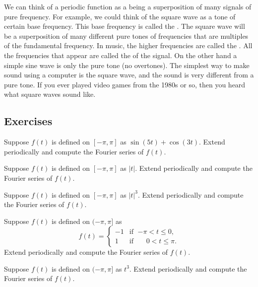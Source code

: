 We can think of a periodic function as a  being a superposition of
many signals of pure frequency.  For example, we could think of the square
wave as a tone of certain base frequency.
This base frequency is called the
\emph{}.
The square wave
will be
a superposition of
many different pure tones of frequencies that are multiples of the
fundamental frequency.
In music,
the higher frequencies are called the \emph{}.
All the frequencies that appear are called the
\emph{} of the signal.
On the other hand a simple sine wave is only the pure tone (no overtones).  The
simplest way to make sound using a computer is the square wave, and the sound
is very different from a pure tone.  If you ever played video games
from the 1980s or so, then you heard what square waves sound like.

\subsection{Exercises}

\begin{exercise}
Suppose $f(t)$ is defined on $[-\pi,\pi]$ as $\sin (5t) + \cos (3t)$.  Extend
periodically and compute the Fourier series of $f(t)$.
\end{exercise}

\begin{exercise}
Suppose $f(t)$ is defined on $[-\pi,\pi]$ as $\lvert t \rvert$.
Extend periodically and compute the Fourier series of $f(t)$.
\end{exercise}

\begin{exercise}
Suppose $f(t)$ is defined on $[-\pi,\pi]$ as $\lvert t \rvert^3$.
Extend periodically and compute the Fourier series of $f(t)$.
\end{exercise}

\begin{exercise}
Suppose $f(t)$ is defined on $(-\pi,\pi]$ as
\begin{equation*}
f(t) =
\begin{cases}
-1 & \text{if } \; {-\pi} < t \leq 0 , \\
1 & \text{if } \; \phantom{-}0 < t \leq \pi .
\end{cases}
\end{equation*}
Extend periodically and compute the Fourier series of $f(t)$.
\end{exercise}

\begin{exercise}
Suppose $f(t)$ is defined on $(-\pi,\pi]$ as $t^3$.
Extend periodically and compute the Fourier series of $f(t)$.
\end{exercise}

